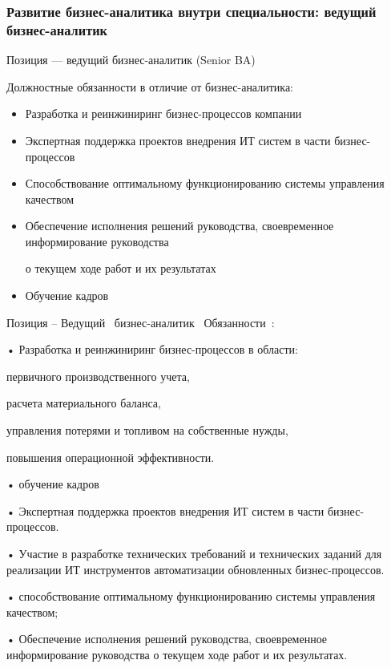 \documentclass{../industrial-development}
\begin{document}
\begin{frame} \frametitle{Развитие бизнес-аналитика внутри специальности: ведущий бизнес-аналитик}
  \begin{block}{}
  \alert{Позиция --- ведущий бизнес-аналитик (Senior  BA) }

Должностные обязанности в отличие от бизнес-аналитика: 
  \end{block}
  \begin{itemize}
  \item  Разработка и реинжиниринг бизнес-процессов компании
  \item Экспертная поддержка проектов внедрения ИТ систем в части бизнес-процессов
  \item Способствование оптимальному функционированию системы управления качеством
 \item  Обеспечение исполнения решений руководства, своевременное информирование руководства 

о текущем ходе работ и их результатах
 \item  Обучение кадров
  \end{itemize}
\end{frame}



\lecturenotes
Позиция – Ведущий~\cite{hh} бизнес-аналитик~\cite{itcf}
Обязанности~\cite{rab}:

•	Разработка и реинжиниринг бизнес-процессов в области:

первичного производственного учета,

 расчета материального баланса,

управления потерями и топливом на собственные нужды,

повышения операционной эффективности.

•         обучение кадров

•	Экспертная поддержка проектов внедрения ИТ систем в части бизнес-процессов.

•	Участие в разработке технических требований и технических заданий для реализации ИТ инструментов автоматизации обновленных бизнес-процессов.  

•	способствование оптимальному функционированию системы управления качеством;

•	Обеспечение исполнения решений руководства, своевременное информирование руководства о текущем ходе работ и их результатах.
\end{document}
